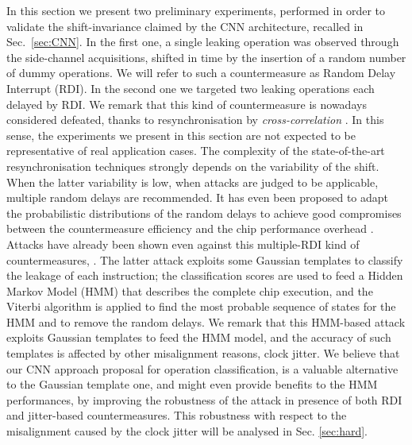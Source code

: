 In this section we present two preliminary  experiments, performed in order to validate the shift-invariance claimed by the CNN architecture, recalled in Sec.~\ref{sec:CNN}. In the first one, a single leaking operation was observed through the side-channel acquisitions, shifted in time by the insertion of a random number of dummy operations. We will refer to such a countermeasure as Random Delay Interrupt (RDI).  In the second one we targeted two leaking operations each delayed by RDI. We remark that this kind of countermeasure is nowadays considered defeated, \eg thanks to resynchronisation by \emph{cross-correlation} \cite{nagashima2007dpa}. In this sense, the experiments we present in this section are not expected to be representative of real application cases. The complexity of the state-of-the-art resynchronisation techniques strongly depends on the variability of the shift. When the latter variability is low, \ie when attacks are judged to be applicable, multiple random delays are recommended. It has even been proposed to adapt the probabilistic distributions of the random delays to achieve good compromises between the countermeasure efficiency and the chip performance overhead \cite{coron2009efficient,coron2010analysis}. Attacks have already been shown even against this multiple-RDI kind of countermeasures, \eg \cite{durvaux2012efficient}. The latter attack exploits some Gaussian templates to classify the leakage of each instruction; the classification scores are used to feed a Hidden Markov Model (HMM) that describes the complete chip execution, and the Viterbi algorithm is applied to find the most probable sequence of states for the HMM and to remove the random delays. We remark that this HMM-based attack exploits Gaussian templates to feed the HMM model, and the accuracy of such templates is affected by other misalignment reasons, \eg clock jitter. We believe that our  CNN approach proposal for operation classification, is a valuable alternative to  the Gaussian template one, and might even provide benefits to the HMM performances, by \eg improving the robustness of the attack in presence of both RDI and jitter-based countermeasures. This robustness with respect to the misalignment caused by the clock jitter will be analysed in Sec. \ref{sec:hard}.

